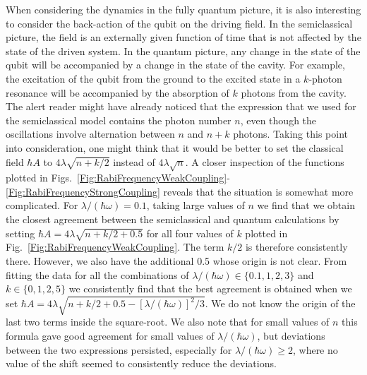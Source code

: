 \documentclass[aps,twocolumn,superscriptaddress]{revtex4}
\begin{document}
When considering the dynamics in the fully quantum picture, it is also interesting to consider the back-action of the qubit on the driving field. In the semiclassical picture, the field is an externally given function of time that is not affected by the state of the driven system. In the quantum picture, any change in the state of the qubit will be accompanied by a change in the state of the cavity. For example, the excitation of the qubit from the ground to the excited state in a $k$-photon resonance will be accompanied by the absorption of $k$ photons from the cavity. The alert reader might have already noticed that the expression that we used for the semiclassical model contains the photon number $n$, even though the oscillations involve alternation between $n$ and $n+k$ photons. Taking this point into consideration, one might think that it would be better to set the classical field $\hbar A$ to $4\lambda\sqrt{n+k/2}$ instead of $4\lambda\sqrt{n}$. A closer inspection of the functions plotted in Figs.~\ref{Fig:RabiFrequencyWeakCoupling}-\ref{Fig:RabiFrequencyStrongCoupling} reveals that the situation is somewhat more complicated. For $\lambda/(\hbar\omega)=0.1$, taking large values of $n$ we find that we obtain the closest agreement between the semiclassical and quantum calculations by setting $\hbar A=4\lambda\sqrt{n+k/2+0.5}$ for all four values of $k$ plotted in Fig.~\ref{Fig:RabiFrequencyWeakCoupling}. The term $k/2$ is therefore consistently there. However, we also have the additional 0.5 whose origin is not clear. From fitting the data for all the combinations of $\lambda/(\hbar\omega)\in\{0.1,1,2,3\}$ and $k\in\{0,1,2,5\}$ we consistently find that the best agreement is obtained when we set $\hbar A=4\lambda\sqrt{n+k/2+0.5-[\lambda/(\hbar\omega)]^2/3}$. We do not know the origin  of the last two terms inside the square-root. We also note that for small values of $n$ this formula gave good agreement for small values of $\lambda/(\hbar\omega)$, but deviations between the two expressions persisted, especially for $\lambda/(\hbar\omega)\geq 2$, where no value of the shift seemed to consistently reduce the deviations.
\end{document}
